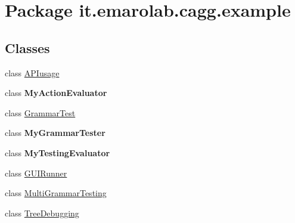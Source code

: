 \hypertarget{namespaceit_1_1emarolab_1_1cagg_1_1example}{\section{Package it.\-emarolab.\-cagg.\-example}
\label{namespaceit_1_1emarolab_1_1cagg_1_1example}
}
\subsection*{Classes}
\begin{DoxyCompactItemize}
\item 
class \hyperlink{classit_1_1emarolab_1_1cagg_1_1example_1_1APIusage}{A\-P\-Iusage}
\item 
class {\bfseries My\-Action\-Evaluator}
\item 
class \hyperlink{classit_1_1emarolab_1_1cagg_1_1example_1_1GrammarTest}{Grammar\-Test}
\item 
class {\bfseries My\-Grammar\-Tester}
\item 
class {\bfseries My\-Testing\-Evaluator}
\item 
class \hyperlink{classit_1_1emarolab_1_1cagg_1_1example_1_1GUIRunner}{G\-U\-I\-Runner}
\item 
class \hyperlink{classit_1_1emarolab_1_1cagg_1_1example_1_1MultiGrammarTesting}{Multi\-Grammar\-Testing}
\item 
class \hyperlink{classit_1_1emarolab_1_1cagg_1_1example_1_1TreeDebugging}{Tree\-Debugging}
\end{DoxyCompactItemize}
